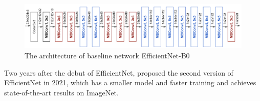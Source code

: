 \begin{figure}[!ht]
    \centering
    \includegraphics[width=\textwidth]{literature/imgs/ext-efficientnetb0.png}
    \caption{The architecture of baseline network EfficientNet-B0 \cite{tan2020efficientnet}}
    \label{fig:ext-efficientnetb0}
\end{figure}

Two years after the debut of EfficientNet, \citet{tan2021efficientnetv2} proposed the second version of EfficientNet in 2021, which has a smaller model and faster training and achieves state-of-the-art results on ImageNet.
